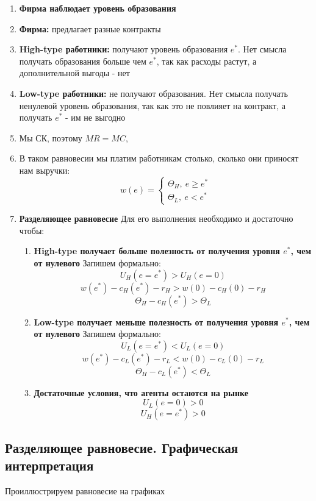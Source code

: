 \begin{enumerate}
    \item \textbf{Фирма наблюдает уровень образования}
    \item \textbf{Фирма:} предлагает разные контракты
    \item \textbf{High-type работники:} получают уровень образования $e^*$. Нет смысла получать образования больше чем $e^*$, так как расходы растут, а дополнительной выгоды - нет
    \item \textbf{Low-type работники:} не получают образования. Нет смысла получать ненулевой уровень образования, так как это не повлияет на контракт, а получать $e^*$ - им не выгодно
    \item Мы СК, поэтому $MR=MC$,
    \item В таком равновесии мы платим работникам столько, сколько они приносят нам выручки: $$w(e)=\begin{cases}
        \Theta_H, \ e \geq e^* \\
        \Theta_L, \ e < e^*
    \end{cases}$$
    \item \textbf{Разделяющее равновесие} Для его выполнения необходимо и достаточно чтобы:\begin{enumerate}
        \item \textbf{High-type получает больше полезность от получения уровня $e^*$, чем от нулевого} Запишем формально:$$U_H(e=e^*)>U_H(e=0)$$
        $$w(e^*)-c_H(e^*)-r_H>w(0)-c_H(0)-r_H$$
        $$\Theta_H-c_H(e^*)>\Theta_L$$
        \item \textbf{Low-type получает меньше полезность от получения уровня $e^*$, чем от нулевого} Запишем формально:$$U_L(e=e^*)<U_L(e=0)$$
        $$w(e^*)-c_L(e^*)-r_L<w(0)-c_L(0)-r_L$$
        $$\Theta_H-c_L(e^*)<\Theta_L$$
        \item \textbf{Достаточные условия, что агенты остаются на рынке} $$U_L(e=0)>0$$
        $$U_H(e=e^*)>0$$
    \end{enumerate}
\end{enumerate}

\subsection{Разделяющее равновесие. Графическая интерпретация}

\indent\setlength{\parindent}{1em}Проиллюстрируем равновесие на графиках

